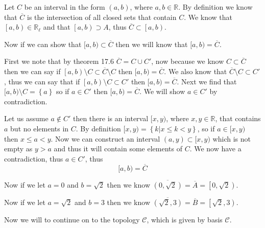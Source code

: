 \documentclass{article}
\let\mathcrl\mathscr
\let\union\cup
\newcommand{\set}[1]{\left\{ {#1} \right\}}
\newcommand{\setbuilder}[2]{\set{#1 | #2}}
\newcommand{\closure}[1]{\overline{#1}}
\newcommand{\limpts}[1]{#1 '}
\newcommand{\ooint}[2]{\left( #1 , #2 \right)}
\newcommand{\coint}[2]{\left[ #1 , #2 \right)}
\begin{document}
Let $C$ be an interval in the form $\ooint ab$, where $a,b\in\mathbb R$. By definition we know that $\closure C $ is the intersection of all closed sets that contain $C$. We know that $\coint ab \in \mathbb R_\ell$ and that $\left[a,b\right) \supset A$, thus $\closure C \subset \left[a,b\right)$.

Now if we can show that $[a,b)\subset\closure C$ then we will know that $[a,b)=\closure C$.

First we note that by theorem 17.6 $\closure C = C \union \limpts C$, now because we know $C \subset \closure C$ then we can say if $\coint ab\setminus C\subset \closure C \setminus C$ then $ [a,b) = \closure C$. We also know that $\closure C \setminus C \subset \limpts C$, thus we can say that if $\coint ab \setminus C \subset \limpts C$ then $[a,b) = \closure C$. Next we find that $[a,b) \setminus C = \set a$ so if $a \in \limpts C$ then $[a,b) = \closure C$. We will show $a\in\limpts C$ by contradiction.

Let us assume $a \not\in\limpts C$ then there is an interval $[x,y)$, where $x,y\in \mathbb R$, that contains $a$ but no elements in $C$. By definition $[x,y) = \setbuilder{k}{x\le k<y}$, so if $a\in[x,y)$ then $x\le a<y$. Now we can construct an interval $(a,y) \subset [x,y)$ which is not empty as $y > a$ and thus it will contain some elements of $C$. We now have a contradiction, thus $a \in \limpts C$, thus
\[
[a,b) = \closure C
\]

Now if we let $a = 0$ and $b = \sqrt2$ then we know $\closure{\ooint{0}{\sqrt2}} = \closure A = \coint{0}{\sqrt2}$.

Now if we let $a = \sqrt2$ and $b = 3$ then we know $\closure{\ooint{\sqrt2}3} = \closure B = \coint{\sqrt2}3$.
\medskip

Now we will to continue on to the topology $\mathcrl C$, which is given by basis $\mathscr C$.
\end{document}
